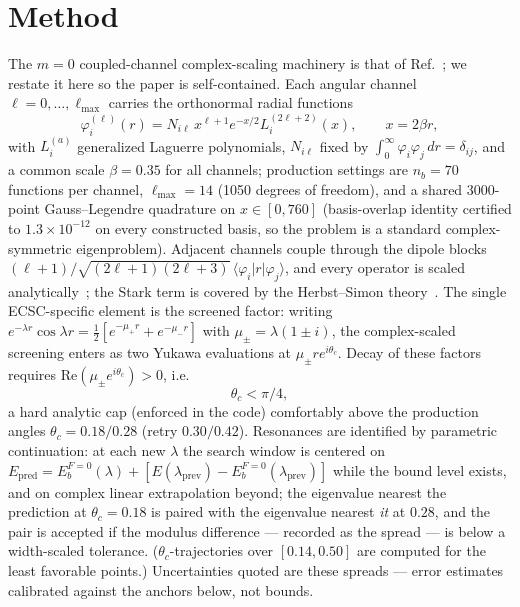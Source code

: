 \documentclass[aps,pre,twocolumn,superscriptaddress,floatfix,longbibliography]{revtex4-2}
\begin{document}
\section{Method}
\label{sec:method}

The $m=0$ coupled-channel complex-scaling machinery is that of
Ref.~\cite{companionD}; we restate it here so the paper is
self-contained. Each angular channel $\ell=0,\dots,\ell_{\max}$
carries the orthonormal radial functions
\begin{equation}
\varphi^{(\ell)}_i(r)=N_{i\ell}\,x^{\ell+1}e^{-x/2}
L^{(2\ell+2)}_i(x),\qquad x=2\beta r,
\end{equation}
with $L^{(a)}_i$ generalized Laguerre polynomials, $N_{i\ell}$ fixed
by $\int_0^\infty\varphi_i\varphi_j\,dr=\delta_{ij}$, and a common
scale $\beta=0.35$ for all channels; production settings are
$n_b=70$ functions per channel, $\ell_{\max}=14$ (1050 degrees of
freedom), and a shared 3000-point Gauss--Legendre quadrature on
$x\in[0,760]$ (basis-overlap identity certified to
$1.3\times10^{-12}$ on every constructed basis, so the problem is a
standard complex-symmetric eigenproblem). Adjacent channels couple
through the dipole blocks
$(\ell+1)/\sqrt{(2\ell+1)(2\ell+3)}\,\langle\varphi_i|r|
\varphi_j\rangle$, and every operator is scaled
analytically~\cite{AguilarCombes1971,BalslevCombes1971,Ho1983,
Reinhardt1982,Moiseyev1998}; the Stark term is covered by the
Herbst--Simon theory~\cite{HerbstSimon1978,Herbst1979}. The single
ECSC-specific element is the screened factor: writing $e^{-\lambda
r}\cos\lambda r=\tfrac12[e^{-\mu_+r}+e^{-\mu_-r}]$ with
$\mu_\pm=\lambda(1\pm i)$, the complex-scaled screening enters as
two Yukawa evaluations at $\mu_\pm re^{i\theta_c}$. Decay of these
factors requires $\mathrm{Re}(\mu_\pm e^{i\theta_c})>0$, i.e.
\begin{equation}
\theta_c<\pi/4,
\end{equation}
a hard analytic cap (enforced in the code) comfortably above the
production angles $\theta_c=0.18/0.28$ (retry $0.30/0.42$).
Resonances are identified by parametric continuation: at each new
$\lambda$ the search window is centered on
$E_{\mathrm{pred}}=E_b^{F=0}(\lambda)+[E(\lambda_{\mathrm{prev}})
-E_b^{F=0}(\lambda_{\mathrm{prev}})]$ while the bound level exists,
and on complex linear extrapolation beyond; the eigenvalue nearest
the prediction at $\theta_c=0.18$ is paired with the eigenvalue
nearest \emph{it} at $0.28$, and the pair is accepted if the
modulus difference --- recorded as the spread --- is below a
width-scaled tolerance. ($\theta_c$-trajectories over
$[0.14,0.50]$ are computed for the least favorable points.)
Uncertainties quoted are these spreads --- error estimates
calibrated against the anchors below, not bounds.
\end{document}
